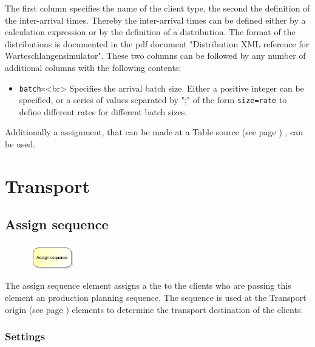 The first column specifies the name of the client type, the second the definition of the inter-arrival times.
Thereby the inter-arrival times can be defined either by a calculation expression or by the definition of a
distribution. The format of the distributions is documented in the pdf document
"Distribution XML reference for Warteschlangensimulator". These two columns can be followed by any number
of additional columns with the following contents:

\begin{itemize}
  \item \texttt{batch=}<br>
  Specifies the arrival batch size. Either a positive integer can be specified, or a series of values separated
  by ";" of the form \texttt{size=rate} to define different rates for different batch sizes. 
\end{itemize}

Additionally a assignment, that can be made at a Table source (see page \pageref{ref:ModelElementSourceTable}) , can be used.





\chapter{Transport}

\section{Assign sequence}
\label{ref:ModelElementAssignSequence}

\begin{figure}
\vspace{-22pt}
\includegraphics[width=2cm]{imageModelElementAssignSequence.png}
\vspace{-22pt}
\end{figure}

The assign sequence element assigns a the to the clients who are passing this element an production planning
sequence. The sequence is used at the Transport origin (see page \pageref{ref:ModelElementTransportSource}) 
elements to determine the transport destination of the clients.

\subsection*{Settings}

